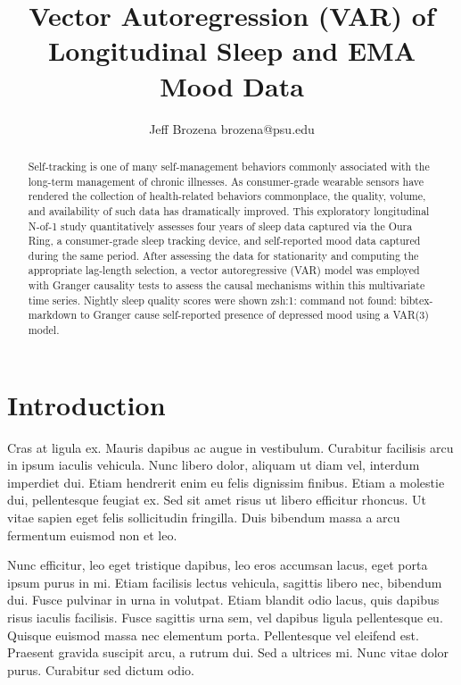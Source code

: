 \documentclass{article}
\begin{document}
\title{Vector Autoregression (VAR) of Longitudinal Sleep and EMA Mood Data}

\author{\name Jeff Brozena \email brozena@psu.edu}
\maketitle

\begin{abstract}%
  Self-tracking is one of many self-management behaviors commonly associated
  with the long-term management of chronic illnesses. As consumer-grade wearable
  sensors have rendered the collection of health-related behaviors commonplace,
  the quality, volume, and availability of such data has dramatically improved.
  This exploratory longitudinal N-of-1 study quantitatively assesses four years
  of sleep data captured via the Oura Ring, a consumer-grade sleep tracking
  device, and self-reported mood data captured during the same period. After
  assessing the data for stationarity and computing the appropriate lag-length
  selection, a vector autoregressive (VAR) model was employed
  with Granger causality tests to assess the causal mechanisms within this
  multivariate time series. Nightly sleep quality scores were shown zsh:1:
  command not found: bibtex-markdown
  to Granger cause
  self-reported presence of depressed mood using a VAR(3) model.
\end{abstract}

\hypertarget{introduction}{%
\section{Introduction}\label{introduction}}

Cras at ligula ex. Mauris dapibus ac augue in vestibulum. Curabitur
facilisis arcu in ipsum iaculis vehicula. Nunc libero dolor, aliquam ut
diam vel, interdum imperdiet dui. Etiam hendrerit enim eu felis
dignissim finibus. Etiam a molestie dui, pellentesque feugiat ex. Sed
sit amet risus ut libero efficitur rhoncus. Ut vitae sapien eget felis
sollicitudin fringilla. Duis bibendum massa a arcu fermentum euismod non
et leo.

Nunc efficitur, leo eget tristique dapibus, leo eros accumsan lacus,
eget porta ipsum purus in mi. Etiam facilisis lectus vehicula, sagittis
libero nec, bibendum dui. Fusce pulvinar in urna in volutpat. Etiam
blandit odio lacus, quis dapibus risus iaculis facilisis. Fusce sagittis
urna sem, vel dapibus ligula pellentesque eu. Quisque euismod massa nec
elementum porta. Pellentesque vel eleifend est. Praesent gravida
suscipit arcu, a rutrum dui. Sed a ultrices mi. Nunc vitae dolor purus.
Curabitur sed dictum odio.
\end{document}
